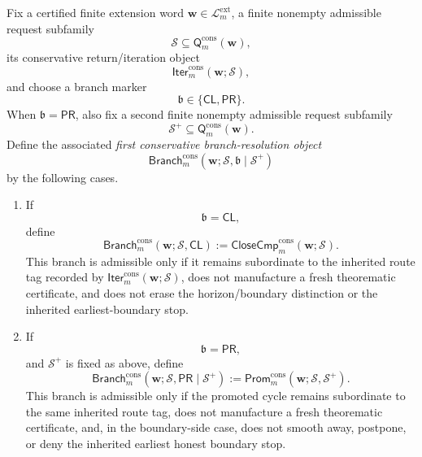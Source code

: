 \begin{definition}
\label{def:first-conservative-branch-resolution-rule}
Fix a certified finite extension word \(\mathbf w\in\mathcal L^{\mathrm{ext}}_{m}\), a finite nonempty admissible request subfamily
\[
  \mathcal S \subseteq \mathsf{Q}^{\mathrm{cons}}_{m}(\mathbf w),
\]
its conservative return/iteration object
\[
  \mathsf{Iter}^{\mathrm{cons}}_{m}(\mathbf w;\mathcal S),
\]
and choose a branch marker
\[
  \mathfrak b\in\{\mathsf{CL},\mathsf{PR}\}.
\]
When \(\mathfrak b=\mathsf{PR}\), also fix a second finite nonempty admissible request subfamily
\[
  \mathcal S^{+}\subseteq \mathsf{Q}^{\mathrm{cons}}_{m}(\mathbf w).
\]
Define the associated \emph{first conservative branch-resolution object}
\[
  \mathsf{Branch}^{\mathrm{cons}}_{m}(\mathbf w;\mathcal S,\mathfrak b\mid\mathcal S^{+})
\]
by the following cases.
\begin{enumerate}[label=(\roman*)]
  \item If
\[
  \mathfrak b=\mathsf{CL},
\]
define
\[
  \mathsf{Branch}^{\mathrm{cons}}_{m}(\mathbf w;\mathcal S,\mathsf{CL})
  :=
  \mathsf{CloseCmp}^{\mathrm{cons}}_{m}(\mathbf w;\mathcal S).
\]
This branch is admissible only if it remains subordinate to the inherited route tag recorded by \(\mathsf{Iter}^{\mathrm{cons}}_{m}(\mathbf w;\mathcal S)\), does not manufacture a fresh theorematic certificate, and does not erase the horizon/boundary distinction or the inherited earliest-boundary stop.

  \item If
\[
  \mathfrak b=\mathsf{PR},
\]
and \(\mathcal S^{+}\) is fixed as above, define
\[
  \mathsf{Branch}^{\mathrm{cons}}_{m}(\mathbf w;\mathcal S,\mathsf{PR}\mid\mathcal S^{+})
  :=
  \mathsf{Prom}^{\mathrm{cons}}_{m}(\mathbf w;\mathcal S,\mathcal S^{+}).
\]
This branch is admissible only if the promoted cycle remains subordinate to the same inherited route tag, does not manufacture a fresh theorematic certificate, and, in the boundary-side case, does not smooth away, postpone, or deny the inherited earliest honest boundary stop.
\end{enumerate}
\end{definition}

